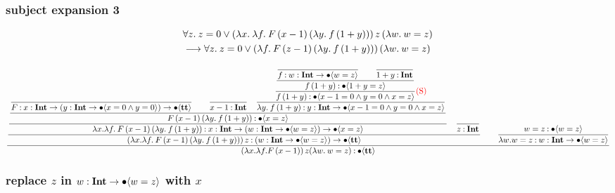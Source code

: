 \documentclass{article}
\begin{document}
\subsubsection{subject expansion 3}
\begin{align*}
    &\forall z.\: z=0 \vee (\lambda x.\: \lambda f.\: F\, (x-1)\, (\lambda y.\: f\,(1+y)))\, z\, (\lambda w.\: w = z) \\
    &\longrightarrow \forall z.\: z=0\vee (\lambda f.\: F\, (z-1)\, (\lambda y.\: f\,(1+y)))\, (\lambda w.\: w = z) 
\end{align*}

\begin{equation*}
    \dfrac{
    \dfrac{
        \dfrac{
            \dfrac{
                    \dfrac{
                    }{
                    F \mathbin{:} {x} : \textbf{Int} \to ({y} : \textbf{Int} \to \bullet \langle x = 0 \wedge y = 0 \rangle) \to \bullet \langle \textbf{tt} \rangle
                    }
                    \qquad
                    \dfrac{}{
                    x - 1 \mathbin{:} \textbf{Int}
                    }
                \quad
                \dfrac{
                    \dfrac{
                        \dfrac{
                            \dfrac{}{
                                f \mathbin{:} {w} : \textbf{Int} \to \bullet \langle  w=z \rangle
                            }
                            \qquad
                            \dfrac{}{
                                1+y \mathbin{:} \textbf{Int}
                            }
                        }{
                            f\,(1+y) \mathbin{:} \bullet \langle 1+y=z \rangle
                        }
                    } {
                        f\,(1+y) \mathbin{:} \bullet \langle x - 1 = 0 \wedge y = 0 \wedge x = z \rangle
                    }\text{\textcolor{red}{(S)}}
                } {
                    \lambda y.\: f\,(1+y) \mathbin{:} {y} : \textbf{Int} \to \bullet \langle x - 1 = 0 \wedge y = 0 \wedge x = z \rangle
                }
            }{
                F\, (x-1)\, (\lambda y.\: f\,(1+y))  \mathbin{:} \bullet \langle x = z \rangle
            }
        }{
            \lambda x. \lambda f.\: F\, (x-1)\, (\lambda y.\: f\,(1+y)) \mathbin{:} {x} : \textbf{Int} \to ({w} : \textbf{Int} \to \bullet \langle w=z \rangle) \to \bullet \langle x = z \rangle
        }
        \quad
        \dfrac{}{
        z \mathbin{:} \textbf{Int}
        }
        }{
            (\lambda x. \lambda f.\: F\, (x-1)\, (\lambda y.\: f\,(1+y)))\, z \mathbin{:} ({w} : \textbf{Int} \to \bullet \langle w = z \rangle) \to \bullet \langle \textbf{tt} \rangle
        }
        \qquad 
        \dfrac{
            w = z \mathbin{:} \bullet \langle  w = z \rangle
        }{
            \lambda w. w = z \mathbin{:} {w} : \textbf{Int} \to \bullet \langle w = z \rangle
        }
    }{
        (\lambda x. \lambda f. F\, (x-1))\, z (\lambda w.\: w = z) \mathbin{:} \bullet \langle \textbf{tt} \rangle
    }
\end{equation*}

\subsubsection{replace \( z \) in \( {w} : \textbf{Int} \to \bullet \langle w = z \rangle \) with \( x \)}
\end{document}
